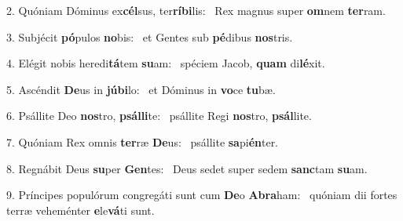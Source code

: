 2. Quóniam Dóminus ex\textbf{cél}sus, ter\textbf{rí}\textbf{bi}lis: \ast\  Rex magnus super \textbf{om}nem \textbf{ter}ram.\

3. Subjécit \textbf{pó}pulos \textbf{no}bis: \ast\  et Gentes sub \textbf{pé}dibus \textbf{nos}tris.\

4. Elégit nobis heredi\textbf{tá}tem \textbf{su}am: \ast\  spéciem Jacob, \textbf{quam} di\textbf{lé}xit.\

5. Ascéndit \textbf{De}us in \textbf{jú}\textbf{bi}lo: \ast\  et Dóminus in \textbf{vo}ce \textbf{tu}bæ.\

6. Psállite Deo \textbf{nos}tro, \textbf{psál}\textbf{li}te: \ast\  psállite Regi \textbf{nos}tro, \textbf{psál}lite.\

7. Quóniam Rex omnis \textbf{ter}ræ \textbf{De}us: \ast\  psállite \textbf{sa}pi\textbf{én}ter.\

8. Regnábit Deus \textbf{su}per \textbf{Gen}tes: \ast\  Deus sedet super sedem \textbf{sanc}tam \textbf{su}am.\

9. Príncipes populórum congregáti sunt cum \textbf{De}o \textbf{A}\textbf{bra}ham: \ast\  quóniam dii fortes terræ veheménter \textbf{e}le\textbf{vá}ti sunt.\

